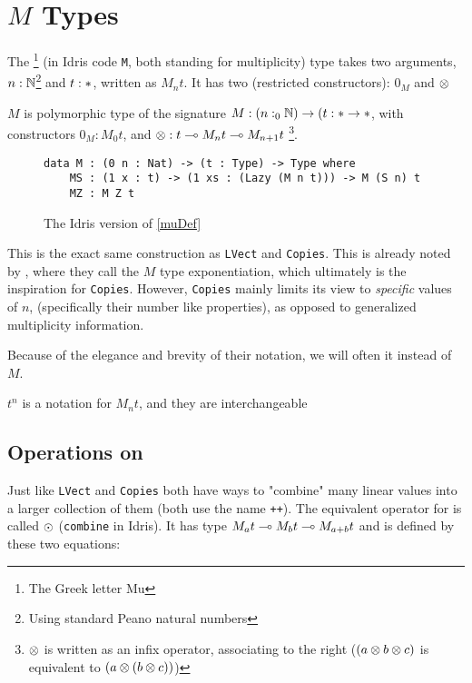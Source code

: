 \section{$M$ Types}

The \tmu \footnote{The Greek letter Mu} (in Idris code \verb|M|, both standing for multiplicity) type takes two arguments, $n : \mathbb{N}$\footnote{Using standard Peano natural numbers} and $t : \ast$, written as $M_n t$. 
It has two (restricted constructors): $0_M$ and $\otimes$

\begin{definition}
	\label{muDef}
	$M$ is polymorphic type of the signature $M : (n :_0 \mathbb{N}) \to (t : \ast \to \ast$, with constructors $0_M : M_0 t$, and $\otimes : t \multimap M_n t \multimap M_{n+1} t$ \footnote{$\otimes$ is written as an infix operator, associating to the right ($(a \otimes b \otimes c)$ is equivalent to $(a \otimes (b \otimes c))$)}.
\end{definition}

\begin{figure}
	\begin{verbatim}
data M : (0 n : Nat) -> (t : Type) -> Type where
	MS : (1 x : t) -> (1 xs : (Lazy (M n t))) -> M (S n) t
	MZ : M Z t
	\end{verbatim}
	The Idris version of \ref{muDef}
\end{figure}

This is the exact same construction as \verb|LVect| and \verb|Copies|\cite{idris_linear}.
This is already noted by \citeauthor{inverse_of_type}, where they call the $M$ type exponentiation, which ultimately is the inspiration for \verb|Copies|. 
However, \verb|Copies| mainly limits its view to \emph{specific} values of $n$, (specifically their number like properties), as opposed to generalized multiplicity information.

Because of the elegance and brevity of their notation, we will often it instead of $M$.
\begin{note}
	$t^n$ is a notation for $M_n t$, and they are interchangeable
\end{note}
\subsection{Operations on \tmu}

Just like \verb|LVect| and \verb|Copies| both have ways to "combine" many linear values into a larger collection of them (both use the name \verb|++|). 
The equivalent operator for \tmu is called $\odot$ (\verb|combine| in Idris). 
It has type $M_a t \multimap M_b t \multimap M_{a + b} t$ and is defined by these two equations:

